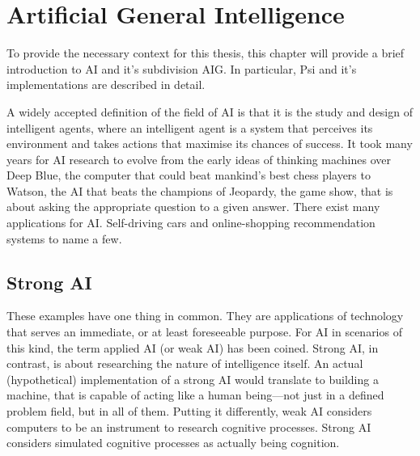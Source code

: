 \chapter{Artificial General Intelligence}

To provide the necessary context for this thesis, this chapter will provide a brief introduction to AI and it's subdivision AIG. In particular, Psi and it's implementations are described in detail.

A widely accepted definition of the field of AI is that it is the study and design of intelligent agents, where an intelligent agent is a system that perceives its environment and takes actions that maximise its chances of success. It took many years for AI research to evolve from the early ideas of thinking machines over Deep Blue, the computer that could beat mankind's best chess players to Watson, the AI that beats the champions of Jeopardy, the game show, that is about asking the appropriate question to a given answer. There exist many applications for AI. Self-driving cars and online-shopping recommendation systems to name a few.

\section{Strong AI}

These examples have one thing in common. They are applications of technology that serves an immediate, or at least foreseeable purpose. For AI in scenarios of this kind, the term applied AI (or weak AI) has been coined. Strong AI, in contrast, is about researching the nature of intelligence itself. An actual (hypothetical) implementation of a strong AI would translate to building a machine, that is capable of acting like a human being---not just in a defined problem field, but in all of them. Putting it differently, weak AI considers computers to be an instrument to research cognitive processes. Strong AI considers simulated cognitive processes as actually being cognition.

